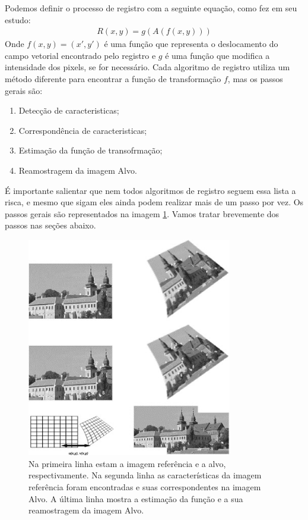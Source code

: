 Podemos definir o processo de registro com a seguinte equação, como \cite{brown1992survey} fez em seu estudo:
\begin{align}\label{eq:defregistro}
    R(x,y) = g(A(f(x,y)))
\end{align}
    Onde $f(x,y) = (x',y')$ é uma função que representa o deslocamento do campo vetorial encontrado pelo registro e 
$g$ é uma função que modifica a intensidade dos pixels, se for necessário. Cada algoritmo de registro utiliza um método
diferente para encontrar a função de transformação $f$, mas os passos gerais são:
\begin{enumerate}
    \item Detecção de caracteristicas;
    \item Correspondência de caracteristicas;
    \item Estimação da função de transofrmação;
    \item Reamostragem da imagem Alvo.
\end{enumerate}
    É importante salientar que nem todos algoritmos de registro seguem essa lista a risca, e mesmo que sigam eles ainda
podem realizar mais de um passo por vez. Os passos gerais são representados na imagem \ref{fig:regExplicacao}. 
Vamos tratar brevemente dos passos nas seções abaixo.
\begin{figure}[H]
    \centering
    \includegraphics[width=0.8\textwidth]{figuras/regSteps.jpg}
    \caption{Na primeira linha estam a imagem referência e a alvo, respectivamente. Na segunda linha as características
da imagem referência foram encontradas e suas correspondentes na imagem Alvo. A última linha mostra a estimação da 
função e a sua reamostragem da imagem Alvo. \citep{zitova2003image}}
    \label{fig:regExplicacao}
\end{figure}

